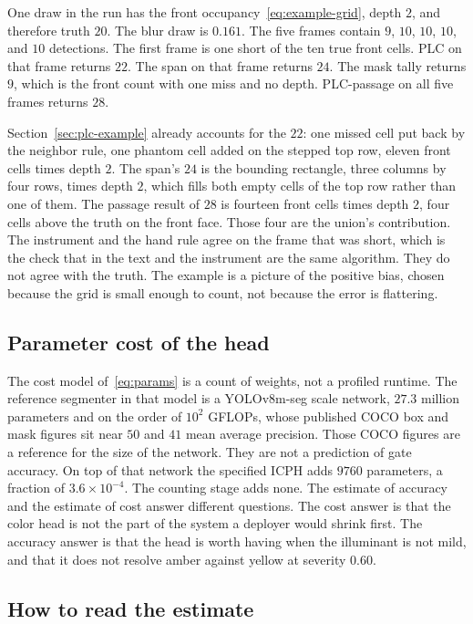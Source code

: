 One draw in the run has the front occupancy~\eqref{eq:example-grid}, depth $2$, and therefore truth $20$. The blur draw is $0.161$. The five frames contain $9$, $10$, $10$, $10$, and $10$ detections. The first frame is one short of the ten true front cells. PLC on that frame returns $22$. The span on that frame returns $24$. The mask tally returns $9$, which is the front count with one miss and no depth. PLC-passage on all five frames returns $28$.

Section~\ref{sec:plc-example} already accounts for the $22$: one missed cell put back by the neighbor rule, one phantom cell added on the stepped top row, eleven front cells times depth $2$. The span's $24$ is the bounding rectangle, three columns by four rows, times depth $2$, which fills both empty cells of the top row rather than one of them. The passage result of $28$ is fourteen front cells times depth $2$, four cells above the truth on the front face. Those four are the union's contribution. The instrument and the hand rule agree on the frame that was short, which is the check that  in the text and the instrument are the same algorithm. They do not agree with the truth. The example is a picture of the positive bias, chosen because the grid is small enough to count, not because the error is flattering.

\subsection{Parameter cost of the head}
\label{sec:cost-result}

The cost model of~\eqref{eq:params} is a count of weights, not a profiled runtime. The reference segmenter in that model is a YOLOv8m-seg scale network, $27.3$ million parameters and on the order of $10^{2}$ GFLOPs, whose published COCO box and mask figures sit near $50$ and $41$ mean average precision. Those COCO figures are a reference for the size of the network. They are not a prediction of gate accuracy. On top of that network the specified ICPH adds $9760$ parameters, a fraction of $3.6\times 10^{-4}$. The counting stage adds none. The estimate of accuracy and the estimate of cost answer different questions. The cost answer is that the color head is not the part of the system a deployer would shrink first. The accuracy answer is that the head is worth having when the illuminant is not mild, and that it does not resolve amber against yellow at severity $0.60$.

\subsection{How to read the estimate}
\label{sec:reading}

